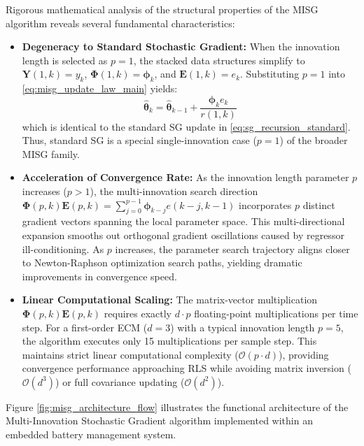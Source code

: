 Rigorous mathematical analysis of the structural properties of the MISG algorithm reveals several fundamental characteristics:
\begin{itemize}
    \item \textbf{Degeneracy to Standard Stochastic Gradient:} When the innovation length is selected as $p = 1$, the stacked data structures simplify to $\mathbf{Y}(1, k) = y_k$, $\boldsymbol{\Phi}(1, k) = \boldsymbol{\phi}_k$, and $\mathbf{E}(1, k) = e_k$. Substituting $p = 1$ into \eqref{eq:misg_update_law_main} yields:
    \begin{equation}
    \hat{\boldsymbol{\theta}}_k = \hat{\boldsymbol{\theta}}_{k-1} + \frac{\boldsymbol{\phi}_k e_k}{r(1, k)}
    \label{eq:misg_degeneracy_proof}
    \end{equation}
    which is identical to the standard SG update in \eqref{eq:sg_recursion_standard}. Thus, standard SG is a special single-innovation case ($p=1$) of the broader MISG family.
    \item \textbf{Acceleration of Convergence Rate:} As the innovation length parameter $p$ increases ($p > 1$), the multi-innovation search direction $\boldsymbol{\Phi}(p, k) \mathbf{E}(p, k) = \sum_{j=0}^{p-1} \boldsymbol{\phi}_{k-j} e(k-j, k-1)$ incorporates $p$ distinct gradient vectors spanning the local parameter space. This multi-directional expansion smooths out orthogonal gradient oscillations caused by regressor ill-conditioning. As $p$ increases, the parameter search trajectory aligns closer to Newton-Raphson optimization search paths, yielding dramatic improvements in convergence speed.
    \item \textbf{Linear Computational Scaling:} The matrix-vector multiplication $\boldsymbol{\Phi}(p, k) \mathbf{E}(p, k)$ requires exactly $d \cdot p$ floating-point multiplications per time step. For a first-order ECM ($d=3$) with a typical innovation length $p = 5$, the algorithm executes only 15 multiplications per sample step. This maintains strict linear computational complexity ($\mathcal{O}(p \cdot d)$), providing convergence performance approaching RLS while avoiding matrix inversion ($\mathcal{O}(d^3)$) or full covariance updating ($\mathcal{O}(d^2)$).
\end{itemize}

Figure \ref{fig:misg_architecture_flow} illustrates the functional architecture of the Multi-Innovation Stochastic Gradient algorithm implemented within an embedded battery management system.


